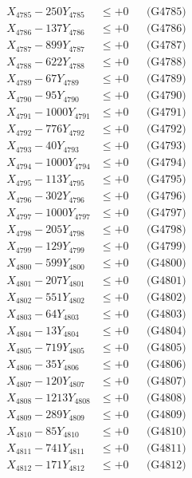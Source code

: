 \documentclass[a4paper,10pt]{article}
\begin{document}
{\begin{align}
X_{4785} - 250Y_{4785} &\leq +0 && \text{(G4785)} \\
X_{4786} - 137Y_{4786} &\leq +0 && \text{(G4786)} \\
X_{4787} - 899Y_{4787} &\leq +0 && \text{(G4787)} \\
X_{4788} - 622Y_{4788} &\leq +0 && \text{(G4788)} \\
X_{4789} - 67Y_{4789} &\leq +0 && \text{(G4789)} \\
X_{4790} - 95Y_{4790} &\leq +0 && \text{(G4790)} \\
\allowbreak
X_{4791} - 1000Y_{4791} &\leq +0 && \text{(G4791)} \\
X_{4792} - 776Y_{4792} &\leq +0 && \text{(G4792)} \\
X_{4793} - 40Y_{4793} &\leq +0 && \text{(G4793)} \\
X_{4794} - 1000Y_{4794} &\leq +0 && \text{(G4794)} \\
X_{4795} - 113Y_{4795} &\leq +0 && \text{(G4795)} \\
X_{4796} - 302Y_{4796} &\leq +0 && \text{(G4796)} \\
X_{4797} - 1000Y_{4797} &\leq +0 && \text{(G4797)} \\
X_{4798} - 205Y_{4798} &\leq +0 && \text{(G4798)} \\
X_{4799} - 129Y_{4799} &\leq +0 && \text{(G4799)} \\
X_{4800} - 599Y_{4800} &\leq +0 && \text{(G4800)} \\
\allowbreak
X_{4801} - 207Y_{4801} &\leq +0 && \text{(G4801)} \\
X_{4802} - 551Y_{4802} &\leq +0 && \text{(G4802)} \\
X_{4803} - 64Y_{4803} &\leq +0 && \text{(G4803)} \\
X_{4804} - 13Y_{4804} &\leq +0 && \text{(G4804)} \\
X_{4805} - 719Y_{4805} &\leq +0 && \text{(G4805)} \\
X_{4806} - 35Y_{4806} &\leq +0 && \text{(G4806)} \\
X_{4807} - 120Y_{4807} &\leq +0 && \text{(G4807)} \\
X_{4808} - 1213Y_{4808} &\leq +0 && \text{(G4808)} \\
X_{4809} - 289Y_{4809} &\leq +0 && \text{(G4809)} \\
X_{4810} - 85Y_{4810} &\leq +0 && \text{(G4810)} \\
\allowbreak
X_{4811} - 741Y_{4811} &\leq +0 && \text{(G4811)} \\
X_{4812} - 171Y_{4812} &\leq +0 && \text{(G4812)} \\

\end{align}}
\end{document}
